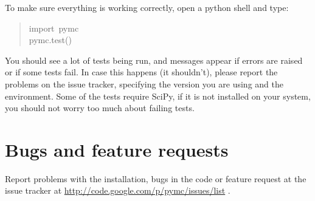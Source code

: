 To make sure everything is working correctly, open a python shell and type:
\begin{quote}{\ttfamily \raggedright \noindent
import~pymc~\\
pymc.test()
}\end{quote}

You should see a lot of tests being run, and messages appear if errors are
raised or if some tests fail. In case this happens (it shouldn't), please report
the problems on the issue tracker, specifying the version you are using and the
environment. Some of the tests require SciPy, if it is not installed on your
system, you should not worry too much about failing tests.



\hypertarget{bugs-and-feature-requests}{}
\section*{Bugs and feature requests}
\label{bugs-and-feature-requests}

Report problems with the installation, bugs in the code or feature request at
the issue tracker at \href{http://code.google.com/p/pymc/issues/list}{http://code.google.com/p/pymc/issues/list} .

\